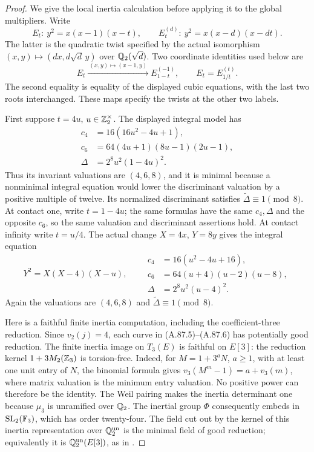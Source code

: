 \begin{proof}
We give the local inertia calculation before applying it to
the global multipliers.  Write
\[
 E_t:\ y^2=x(x-1)(x-t),\qquad
 E_t^{(d)}:\ y^2=x(x-d)(x-dt).
\tag{A.87.3}
\]
The latter is the quadratic twist specified by the actual
isomorphism $(x,y)\mapsto(dx,d\sqrt d\,y)$ over
$\mathbb Q_2(\sqrt d)$.  Two coordinate identities used below are
\[
 E_t\xrightarrow{\ (x,y)\mapsto(x-1,y)\ }
                E_{1-t}^{(-1)},
       \qquad E_t=E_{1/t}^{(t)}.
\tag{A.87.4}
\]
The second equality is equality of the displayed cubic
equations, with the last two roots interchanged.  These maps
specify the twists at the other two labels.

First suppose $t=4u$, $u\in\mathbb Z_2^\times$.
The displayed integral model has
\[
\begin{aligned}
 c_4&=16(16u^2-4u+1),\\
 c_6&=64(4u+1)(8u-1)(2u-1),\\
 \Delta&=2^8u^2(1-4u)^2.
\end{aligned}
\tag{A.87.5}
\]
Thus its invariant valuations are $(4,6,8)$, and it is
minimal because a nonminimal integral equation would lower
the discriminant valuation by a positive multiple of twelve.
Its normalized discriminant satisfies
$\widetilde\Delta\equiv1\pmod8$.
At contact one, write $t=1-4u$; the same formulas have the
same $c_4,\Delta$ and the opposite $c_6$, so the same
valuation and discriminant assertions hold.
At contact infinity write $t=u/4$.  The actual change
$X=4x$, $Y=8y$ gives the integral equation
\[
 Y^2=X(X-4)(X-u),\qquad
 \begin{aligned}
 c_4&=16(u^2-4u+16),\\
 c_6&=64(u+4)(u-2)(u-8),\\
 \Delta&=2^8u^2(u-4)^2.
 \end{aligned}
\tag{A.87.6}
\]
Again the valuations are $(4,6,8)$ and
$\widetilde\Delta\equiv1\pmod8$.

Here is a faithful finite inertia computation, including
the coefficient-three reduction.  Since $v_2(j)=4$, each
curve in (A.87.5)--(A.87.6) has potentially good reduction.
The finite inertia image on $T_3(E)$ is faithful on $E[3]$:
the reduction kernel $1+3M_2(\mathbb Z_3)$ is torsion-free.
Indeed, for $M=1+3^aN$, $a\ge1$, with at least one unit
entry of $N$, the binomial formula gives
$v_3(M^m-1)=a+v_3(m)$, where matrix valuation is the
minimum entry valuation.  No positive power can therefore
be the identity.
The Weil pairing makes the inertia determinant one because
$\mu_3$ is unramified over $\mathbb Q_2$.
The inertial group $\Phi$ consequently embeds in
$\mathrm{SL}_2(\mathbb F_3)$, which has order twenty-four.
The field cut out by the kernel of this inertia representation
over $\mathbb Q_2^{\mathrm{un}}$ is the minimal field of good reduction;
equivalently it is
$\mathbb Q_2^{\mathrm{un}}(E[3])$, as in
\cite[\S4.1]{LegFreitasKraus2022}.


\end{proof}
